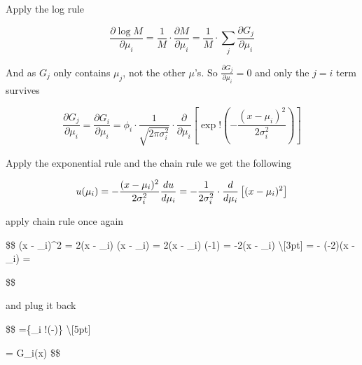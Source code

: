 \documentclass[
]{article}
\begin{document}
Apply the log rule

\[
\frac{\partial \log M}{\partial \mu_i} = \frac{1}{M} \cdot \frac{\partial M}{\partial \mu_i}  = \frac{1}{M} \cdot \sum_j \frac{\partial G_j}{\partial \mu_i} 
\]

And as \(G_j\) only contains \(\mu_j\), not the other \(\mu\)'s. So
\(\frac{\partial G_j}{\partial \mu_i} = 0\) and only the \(j=i\) term
survives

\[
\frac{\partial G_j}{\partial \mu_i} = \frac{\partial G_i}{\partial \mu_i} = \phi_i \cdot \frac{1}{\sqrt{2\pi\sigma_i^2}} \cdot \frac{\partial}{\partial \mu_i}\left[ \exp!\left( -\frac{(x-\mu_i)^2}{2\sigma_i^2} \right) \right]
\]

Apply the exponential rule and the chain rule we get the following

\[
u(\mu_i) = -\frac{(x-\mu_i)^2}{2\sigma_i^2} \\[3pt]\frac{du}{d\mu_i} = -\frac{1}{2\sigma_i^2} \cdot \frac{d}{d\mu_i}\left[(x-\mu_i)^2\right]
\]

apply chain rule once again

\$\$ (x - \mu\_i)\^{}2 = 2(x - \mu\_i)
\cdot {}(x - \mu\_i) = 2(x - \mu\_i) \cdot (-1) = -2(x -
\mu\_i) \textbackslash{[}3pt{]}  =
- \cdot (-2)(x - \mu\_i) =

\$\$

and plug it back

\$\$  =\{\phi\_i
\cdot {}
\cdot \exp!\left(-\right)\}\cdot {}
\textbackslash{[}5pt{]}

 = G\_i(x)
\cdot {} \$\$
\end{document}
